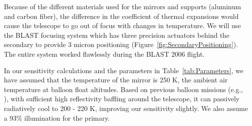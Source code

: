 Because of the different materials used for the mirrors and supports
(aluminum and carbon fiber), the difference in the coefficient of
thermal expansions would cause the telescope to go out of focus with
changes in temperature.  We will use the BLAST focusing system which
has three precision actuators behind the secondary to provide 3 micron
positioning (Figure~\ref{fig:SecondaryPositioning}).  The entire
system worked flawlessly during the BLAST 2006 flight.

In our sensitivity calculations and the parameters in
Table~\ref{tab:Parameters}, we have assumed that the temperature of
the mirror is 250 K, the ambient air temperature at balloon float
altitudes.  Based on previous balloon missions (e.g.,
), with sufficient high reflectivity
baffling around the telescope, it can passively radiatively cool to
200 - 220 K, improving our sensitivity slightly.  We also assume a
93\% illumination for the primary.

